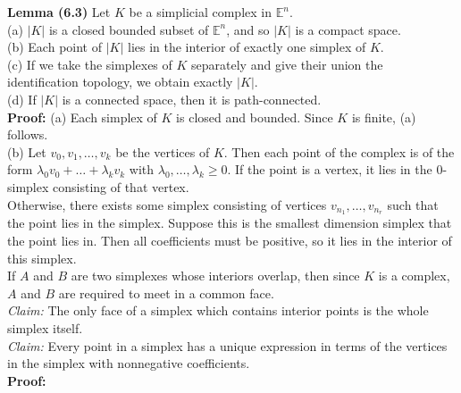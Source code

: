 \documentclass[a4paper]{article}
\begin{document}
\textbf{Lemma (6.3)} Let $K$ be a simplicial complex in 
$\mathbb{E}^{n}$.\\
\linebreak
(a) $\left| K \right| $ is a closed bounded subset of $\mathbb{E}^{n}$, and so
$\left| K \right| $ is a compact space.\\
(b) Each point of $\left| K \right| $ lies in the interior of exactly one
simplex
of $K$.\\
\linebreak
(c) If we take the simplexes of $K$ separately and give their union the
identification topology, we obtain exactly $\left| K \right| $.\\
(d) If $\left| K \right| $ is a connected space, then it is path-connected.\\
\linebreak
\textbf{Proof:} (a) Each simplex of $K$ is closed and bounded. Since
$K$ is finite, (a) follows.\\
(b) Let $v_0, v_1, \ldots, v_k$ be the vertices of $K$. Then each point of the
complex is of the form
$\lambda_0 v_0 + \ldots + \lambda_k v_k$ with
$\lambda_0, \ldots , \lambda_k \ge 0$. If the point is a vertex,
it lies in the $0$-simplex consisting of that vertex.\\
Otherwise, there exists some simplex consisting of vertices
$v_{n_1}, \ldots, v_{n_r}$ such that the point lies in the simplex. Suppose
this is the smallest dimension simplex that the point lies in. Then
all coefficients must be positive, so it lies in the interior of this
simplex.\\
If $A$ and $B$ are two simplexes whose interiors overlap, then since $K$ is a 
complex, $A$ and $B$ are required to meet in a common face. \\
\textit{Claim:} The only face of a simplex which contains interior points is
the whole simplex itself.\\
\textit{Claim:} Every point in a simplex has a unique expression in terms of
the vertices in the simplex with nonnegative coefficients.\\
\linebreak
\textbf{Proof:} 
\end{document}
